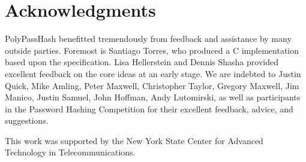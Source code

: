 \section{Acknowledgments}

PolyPassHash benefitted tremendously from feedback and assistance by many 
outside parties.   Foremost is Santiago Torres, who produced a C 
implementation based upon the specification.   Lisa Hellerstein and Dennis
Shasha provided excellent feedback on the core ideas at an early stage.   
We are indebted to Justin Quick, Mike Amling, Peter Maxwell, Christopher 
Taylor, Gregory Maxwell, Jim Manico, Justin Samuel, John Hoffman, 
Andy Lutomirski, as well as participants in the Password Hashing 
Competition for their excellent feedback, advice, and suggestions.

This work was supported by the New York State Center for Advanced Technology 
in Telecommunications.
